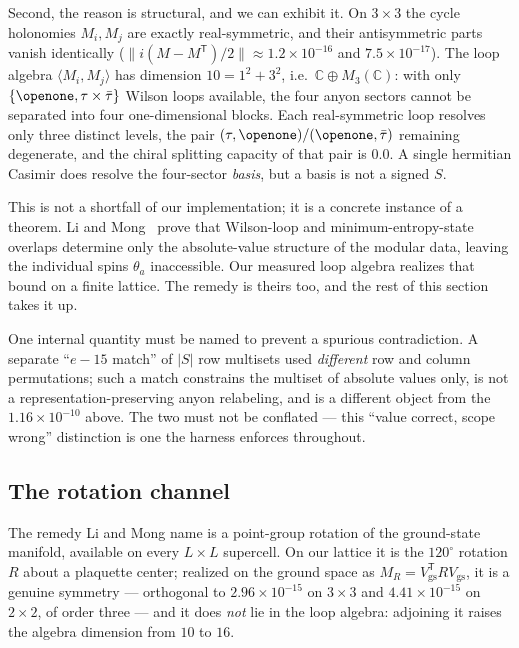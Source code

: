 \documentclass[aps,pra,twocolumn,superscriptaddress,longbibliography,floatfix,nofootinbib]{revtex4-2}
\newcommand{\Id}{\openone}
\begin{document}
Second, the reason is structural, and we can exhibit it. On $3\times3$ the cycle
holonomies $M_i,M_j$ are exactly real-symmetric, and their antisymmetric parts
vanish identically ($\lVert i(M-M^{\mathsf T})/2\rVert \approx 1.2\times10^{-16}$
and $7.5\times10^{-17}$). The loop algebra $\langle M_i,M_j\rangle$ has
dimension $10=1^{2}+3^{2}$, i.e.\ $\mathbb{C}\oplus M_3(\mathbb{C})$: with only
$\{\Id,\tau\times\bar\tau\}$ Wilson loops available, the four anyon sectors
cannot be separated into four one-dimensional blocks. Each real-symmetric loop
resolves only three distinct levels, the pair $(\tau,\Id)/(\Id,\bar\tau)$
remaining degenerate, and the chiral splitting capacity of that pair is $0.0$. A
single hermitian Casimir does resolve the four-sector \emph{basis}, but a basis
is not a signed $S$.

This is not a shortfall of our implementation; it is a concrete instance of a
theorem. Li and Mong~\cite{LiMong2022} prove that Wilson-loop and
minimum-entropy-state overlaps determine only the absolute-value structure of
the modular data, leaving the individual spins $\theta_a$ inaccessible. Our
measured loop algebra realizes that bound on a finite lattice. The remedy is
theirs too, and the rest of this section takes it up.

One internal quantity must be named to prevent a spurious contradiction. A
separate ``$e{-}15$ match'' of $|S|$ row multisets used \emph{different} row and
column permutations; such a match constrains the multiset of absolute values
only, is not a representation-preserving anyon relabeling, and is a different
object from the $1.16\times10^{-10}$ above. The two must not be conflated ---
this ``value correct, scope wrong'' distinction is one the harness enforces
throughout.

\subsection{The rotation channel}
\label{sec:rotation}

The remedy Li and Mong name is a point-group rotation of the ground-state
manifold, available on every $L\times L$ supercell. On our lattice it is the
$120^{\circ}$ rotation $R$ about a plaquette center; realized on the ground
space as $M_R=V_{\mathrm{gs}}^{\mathsf T}RV_{\mathrm{gs}}$, it is a genuine
symmetry --- orthogonal to $2.96\times10^{-15}$ on $3\times3$ and
$4.41\times10^{-15}$ on $2\times2$, of order three --- and it does \emph{not}
lie in the loop algebra: adjoining it raises the algebra dimension from $10$ to
$16$.
\end{document}

